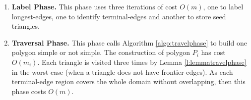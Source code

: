 \documentclass[lineno,pdflatex,sn-mathphys]{sn-jnl}%
\theoremstyle{thmstyleone}%
\theoremstyle{thmstyletwo}%
\theoremstyle{thmstylethree}%
\begin{document}
\begin{enumerate}
    \item \textbf{Label Phase.} This phase uses three iterations of cost $O(m)$, one to label longest-edges, one to identify  terminal-edges and another to store seed triangles.
    \item \textbf{Traversal Phase.} This phase calls Algorithm \ref{algo:travelphase} to build one polygon simple or not simple. The construction of polygon $P_i$ has cost $O(m_i)$. Each triangle is visited  three times by Lemma \ref{l:lemmatravelphase} in the worst case (when a triangle does not have frontier-edges). As each terminal-edge region covers the whole domain without overlapping, then this phase  costs $O(m)$.
    

\end{enumerate}
\end{document}
